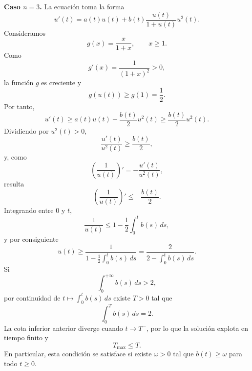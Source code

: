 {    \textbf{Caso $n=3$.} La ecuación toma la forma
    \[
        u'(t)=a(t)u(t)+b(t)\frac{u(t)}{1+u(t)}u^2(t).
    \]
    Consideramos
    \[
        g(x)=\frac{x}{1+x},\qquad x\geq1.
    \]
    Como
    \[
        g'(x)=\frac{1}{(1+x)^2}>0,
    \]
    la función $g$ es creciente y
    \[
        g(u(t))\geq g(1)=\frac12.
    \]
    Por tanto,
    \[
        u'(t)\geq a(t)u(t)+\frac{b(t)}{2}u^2(t)
        \geq \frac{b(t)}{2}u^2(t).
    \]
    Dividiendo por $u^2(t)>0$,
    \[
        \frac{u'(t)}{u^2(t)}\geq\frac{b(t)}{2},
    \]
    y, como
    \[
        \left(\frac{1}{u(t)}\right)'=-\frac{u'(t)}{u^2(t)},
    \]
    resulta
    \[
        \left(\frac{1}{u(t)}\right)'\leq-\frac{b(t)}{2}.
    \]
    Integrando entre $0$ y $t$,
    \[
        \frac{1}{u(t)}\leq1-\frac12\int_0^t b(s)\,ds,
    \]
    y por consiguiente
    \[
        u(t)\geq\frac{1}{1-\frac12\int_0^t b(s)\,ds}
        =\frac{2}{2-\int_0^t b(s)\,ds}.
    \]
    Si
    \[
        \int_0^{+\infty}b(s)\,ds>2,
    \]
    por continuidad de $t\mapsto\int_0^t b(s)\,ds$ existe $T>0$ tal que
    \[
        \int_0^T b(s)\,ds=2.
    \]
    La cota inferior anterior diverge cuando $t\to T^{-}$, por lo que la solución explota en tiempo finito y
    \[
        T_{\max}\leq T.
    \]
    En particular, esta condición se satisface si existe $\omega>0$ tal que $b(t)\geq\omega$ para todo $t\geq0$.
}


